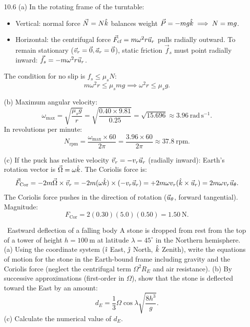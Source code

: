 \begin{solution}{10.6}
(a) In the rotating frame of the turntable:
\begin{itemize}[leftmargin=1.4em,itemsep=2pt]
  \item Vertical: normal force $\vec{N} = N\hat{k}$ balances weight $\vec{P} = -mg\hat{k} \implies N = mg$.
  \item Horizontal: the centrifugal force $\vec{F}_{\text{cf}} = m\omega^2 r\vec{u}_r$ pulls radially outward. To remain stationary ($\vec{v}_r = \vec{0}, \vec{a}_r = \vec{0}$), static friction $\vec{f}_s$ must point radially inward: $\vec{f}_s = -m\omega^2 r\vec{u}_r$.
\end{itemize}
The condition for no slip is $f_s \le \mu_s N$:
\[
m\omega^2 r \le \mu_s mg \implies \omega^2 r \le \mu_s g.
\]

(b) Maximum angular velocity:
\[
\omega_{\max} = \sqrt{\frac{\mu_s g}{r}} = \sqrt{\frac{0.40\times 9.81}{0.25}} = \sqrt{15.696} \approx 3.96\ \mathrm{rad\,s^{-1}}.
\]
In revolutions per minute:
\[
N_{\text{rpm}} = \frac{\omega_{\max}\times 60}{2\pi} = \frac{3.96\times 60}{2\pi} \approx 37.8\ \mathrm{rpm}.
\]

(c) If the puck has relative velocity $\vec{v}_r = -v_r\vec{u}_r$ (radially inward):
Earth's rotation vector is $\vec{\Omega} = \omega\hat{k}$. The Coriolis force is:
\[
\vec{F}_{\text{Cor}} = -2m\vec{\Omega}\times\vec{v}_r = -2m(\omega\hat{k})\times(-v_r\vec{u}_r) = +2m\omega v_r(\hat{k}\times\vec{u}_r) = 2m\omega v_r\vec{u}_\theta.
\]
The Coriolis force pushes in the direction of rotation ($\vec{u}_\theta$, forward tangential).
Magnitude:
\[
F_{\text{Cor}} = 2(0.30)(5.0)(0.50) = 1.50\ \mathrm{N}.
\]
\end{solution}

\begin{exercise}{\mastery\ Eastward deflection of a falling body}
A stone is dropped from rest from the top of a tower of height $h=100\ \mathrm{m}$ at latitude $\lambda=45^\circ$ in the Northern hemisphere.
(a) Using the coordinate system ($\hat{\imath}$ East, $\hat{\jmath}$ North, $\hat{k}$ Zenith), write the equations of motion for the stone in the Earth-bound frame including gravity and the Coriolis force (neglect the centrifugal term $\Omega^2 R_E$ and air resistance).
(b) By successive approximations (first-order in $\Omega$), show that the stone is deflected toward the East by an amount:
\[
d_E = \frac{1}{3}\Omega\cos\lambda\sqrt{\frac{8h^3}{g}}.
\]
(c) Calculate the numerical value of $d_E$.
\end{exercise}

\begin{tabletworkspace}[6.5cm]
\end{tabletworkspace}

